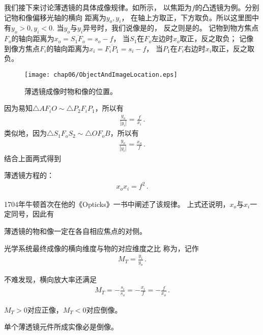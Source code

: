 我们接下来讨论薄透镜的具体成像规律。如所示，
以焦距为$f$的凸透镜为例。分别记物和像偏移光轴的横向
距离为$y_o, y_i$，
在轴上方取正，下方取负。所以这里图中有$y_o>0, y_i<0$.
当$y_o$与$y_i$异号时，我们说像是的，
反之则是的。
记物到物方焦点$F_o$的轴向距离为$x_o=\overline{S_1F_o}=s_o-f$，
当$S_1$在$F_o$左边时$x_o$取正，反之取负；
记像到像方焦点$F_i$的轴向距离为$x_i=\overline{F_iP_1}=s_i-f$，
当$P_1$在$F_i$右边时$x_i$取正，反之取负。
\begin{figure}[htbp]
    \centering\texttt{[image: chap06/ObjectAndImageLocation.eps]}
    \caption{薄透镜成像时物和像的位置。}
    \label{fig:6.39}
\end{figure}

因为易知$\triangle AF_iO\sim\triangle P_2F_iP_1$，所以有
\begin{align}
    \frac{y_o}{|y_i|}=\frac{f}{x_i}\, .
\end{align}
类似地，因为$\triangle S_1F_oS_2\sim\triangle OF_oB$，所以有
\begin{align}
    \frac{y_o}{|y_i|}=\frac{x_o}{f}\, .
\end{align}
结合上面两式得到
\begin{proposition}
    薄透镜方程的：
    \begin{align}
        x_ox_i=f^2\, .
    \end{align}
\end{proposition}
1704年牛顿首次在他的《Opticks》一书中阐述了该规律。
上式还说明，$x_o$与$x_i$一定同号，因此有
\begin{corollary}
    薄透镜的物和像一定在各自相应焦点的对侧。
\end{corollary}

\begin{definition}
    光学系统最终成像的横向维度与物的对应维度之比
    称为，记作
    \begin{align}
        M_T=\frac{y_i}{y_o}\, .
    \end{align}
\end{definition}
不难发现，横向放大率还满足
\begin{align}
    M_T=-\frac{s_i}{s_o}=-\frac{x_i}{f}=-\frac{f}{x_o}\, .
\end{align}

\begin{corollary}
    $M_T>0$对应正像，$M_T<0$对应倒像。
\end{corollary}
\begin{corollary}
    单个薄透镜元件所成实像必是倒像。
\end{corollary}

